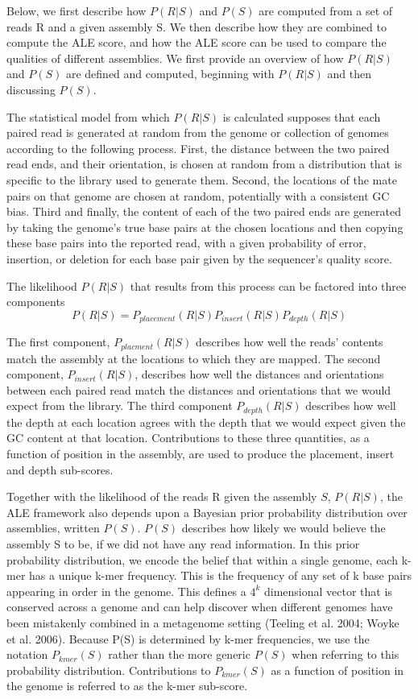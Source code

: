 \documentclass[phd,tocprelim]{cornell}
\begin{document}
Below, we first describe how $P(R|S)$ and $P(S)$ are computed from a set of reads R and a given assembly S.  We then describe how they are combined to compute the ALE score, and how the ALE score can be used to compare the qualities of different assemblies. We first provide an overview of how $P(R|S)$ and $P(S)$ are defined and computed, beginning with $P(R|S)$ and then discussing $P(S)$.

The statistical model from which $P(R|S)$ is calculated supposes that each paired read is generated at random from the genome or collection of genomes according to the following process.  First, the distance between the two paired read ends, and their orientation, is chosen at random from a distribution that is specific to the library used to generate them.  Second, the locations of the mate pairs on that genome are chosen at random, potentially with a consistent GC bias.  Third and finally, the content of each of the two paired ends are generated by taking the genome’s true base pairs at the chosen locations and then copying these base pairs into the reported read, with a given probability of error, insertion, or deletion for each base pair given by the sequencer’s quality score.

The likelihood $P(R|S)$ that results from this process can be factored into three components
\begin{equation}
    P(R|S)=P_{placement}(R|S)P_{insert}(R|S)P_{depth}(R|S)
\end{equation}

The first component, $P_{placment}(R|S)$ describes how well the reads’ contents match the assembly at the locations to which they are mapped. The second component, $P_{insert}(R|S)$, describes how well the distances and orientations between each paired read match the distances and orientations that we would expect from the library.  The third component $P_{depth}(R|S)$ describes how well the depth at each location agrees with the depth that we would expect given the GC content at that location. Contributions to these three quantities, as a function of position in the assembly, are used to produce the placement, insert and depth sub-scores.

Together with the likelihood of the reads R given the assembly $S$, $P(R|S)$, the ALE framework also depends upon a Bayesian prior probability distribution over assemblies, written $P(S)$.  $P(S)$ describes how likely we would believe the assembly S to be, if we did not have any read information.  In this prior probability distribution, we encode the belief that within a single genome, each k-mer has a unique k-mer frequency. This is the frequency of any set of k base pairs appearing in order in the genome. This defines a $4^{k}$ dimensional vector that is conserved across a genome and can help discover when different genomes have been mistakenly combined in a metagenome setting (Teeling et al. 2004; Woyke et al. 2006). Because P(S) is determined by k-mer frequencies, we use the notation $P_{kmer}(S)$ rather than the more generic $P(S)$ when referring to this probability distribution. Contributions to $P_{kmer}(S)$ as a function of position in the genome is referred to as the k-mer sub-score.
\end{document}
